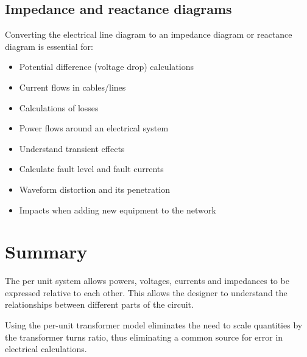 \documentclass[class=report, crop=false, 12pt,a4paper]{standalone}
\begin{document}
\subsection{Impedance and reactance diagrams}
Converting the electrical line diagram to an impedance diagram or reactance diagram is essential for:
\begin{itemize}
	\item Potential difference (voltage drop) calculations
	\item Current flows in cables/lines
	\item Calculations of losses
	\item Power flows around an electrical system
	\item Understand transient effects
	\item Calculate fault level and fault currents
	\item Waveform distortion and its penetration
	\item Impacts when adding new equipment to the network
\end{itemize}
\section{Summary}
The per unit system allows powers, voltages, currents and impedances to be expressed relative to each other. This allows the designer to understand the relationships between different parts of the circuit.

Using the per-unit transformer model eliminates the need to scale quantities by the transformer turns ratio, thus eliminating a common source for error in electrical calculations.
\end{document}
